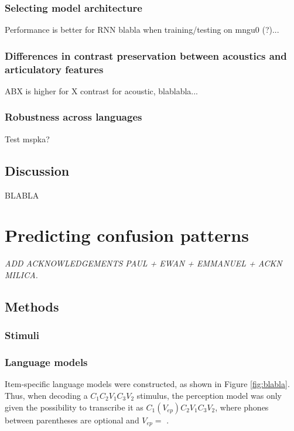 \subsubsection{Selecting model architecture}
{\color{red}Performance is better for RNN blabla when training/testing on mngu0 (?)...}

\subsubsection{Differences in contrast preservation between acoustics and articulatory features}
{\color{red}ABX is higher for X contrast for acoustic, blablabla...}

\subsubsection{Robustness across languages}
{\color{red}Test mspka?}
\subsection{Discussion}

BLABLA



\section{Predicting confusion patterns}
\small{\textit{{\color{red}ADD ACKNOWLEDGEMENTS PAUL + EWAN + EMMANUEL + ACKN MILICA.\\}}}

\subsection{Methods}
\subsubsection{Stimuli}

\subsubsection{Language models}
Item-specific language models were constructed, as shown in Figure \ref{fig:blabla}. Thus, when decoding a $C_{1}C_{2}V_{1}C_{3}V_{2}$ stimulus, the perception model was only given the possibility to transcribe it as $C_{1}(V_{ep})C_{2}V_{1}C_{3}V_{2}$, where phones between parentheses are optional and $V_{ep} = $ \textipa{[@]}. 

